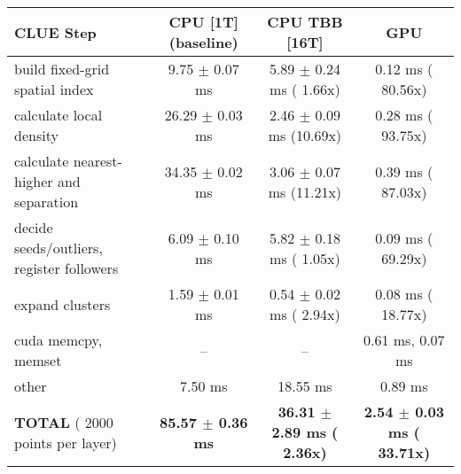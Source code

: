     \begin{tabular}{l|c|c|c}
    \hline
    CLUE Step                                 & CPU [1T] (baseline)         & CPU TBB [16T]                         & GPU                       \\ \hline
    build fixed-grid spatial index            &   9.75 $\pm$  0.07 ms       &   5.89 $\pm$  0.24 ms ( 1.66x)        &   0.12 ms ( 80.56x)       \\
    calculate local density                   &  26.29 $\pm$  0.03 ms       &   2.46 $\pm$  0.09 ms (10.69x)        &   0.28 ms ( 93.75x)       \\
    calculate nearest-higher and separation   &  34.35 $\pm$  0.02 ms       &   3.06 $\pm$  0.07 ms (11.21x)        &   0.39 ms ( 87.03x)       \\
    decide seeds/outliers, register followers &   6.09 $\pm$  0.10 ms       &   5.82 $\pm$  0.18 ms ( 1.05x)        &   0.09 ms ( 69.29x)       \\
    expand clusters                           &   1.59 $\pm$  0.01 ms       &   0.54 $\pm$  0.02 ms ( 2.94x)        &   0.08 ms ( 18.77x)       \\ \hline
    cuda memcpy, memset                       & --                          & --                                    &   0.61 ms,   0.07 ms      \\ 
    other                                     &   7.50 ms                   &  18.55 ms                             &   0.89 ms                 \\ \hline
    \textbf{TOTAL} ( 2000 points per layer)   & \textbf{ 85.57 $\pm$  0.36 ms} & \textbf{ 36.31 $\pm$  2.89 ms ( 2.36x)} & \textbf{  2.54 $\pm$  0.03 ms ( 33.71x)}  \\
    \hline 
    \end{tabular}
    \linebreak


